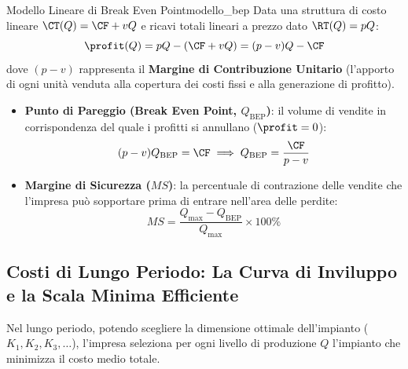 \begin{modello}{Modello Lineare di Break Even Point}{modello_bep}
Data una struttura di costo lineare $\CT(Q) = \CF + vQ$ e ricavi totali lineari a prezzo dato $\RT(Q) = pQ$:
\begin{equation}
    \profit(Q) = pQ - (\CF + vQ) = (p - v)Q - \CF
\end{equation}
dove $(p - v)$ rappresenta il \textbf{Margine di Contribuzione Unitario} (l'apporto di ogni unità venduta alla copertura dei costi fissi e alla generazione di profitto).
\begin{itemize}
    \item \textbf{Punto di Pareggio (Break Even Point, $Q_{\text{BEP}}$)}: il volume di vendite in corrispondenza del quale i profitti si annullano ($\profit = 0$):
    \begin{equation}
        (p - v)Q_{\text{BEP}} = \CF \implies Q_{\text{BEP}} = \frac{\CF}{p - v}
    \end{equation}
    \item \textbf{Margine di Sicurezza ($MS$)}: la percentuale di contrazione delle vendite che l'impresa può sopportare prima di entrare nell'area delle perdite:
    \begin{equation}
        MS = \frac{Q_{\max} - Q_{\text{BEP}}}{Q_{\max}} \times 100\%
    \end{equation}
\end{itemize}
\end{modello}

\subsection{Costi di Lungo Periodo: La Curva di Inviluppo e la Scala Minima Efficiente}
Nel lungo periodo, potendo scegliere la dimensione ottimale dell'impianto ($K_1, K_2, K_3, \dots$), l'impresa seleziona per ogni livello di produzione $Q$ l'impianto che minimizza il costo medio totale.

